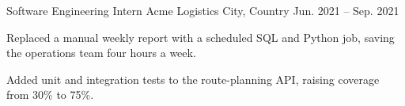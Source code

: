 \cventry
  {Software Engineering Intern}               %
  {Acme Logistics}                            %
  {City, Country}                             %
  {Jun. 2021 -- Sep. 2021}                    %
  {
    \begin{cvitems}
      \item {Replaced a manual weekly report with a scheduled SQL and Python
      job, saving the operations team four hours a week.}
      \item {Added unit and integration tests to the route-planning API,
      raising coverage from 30\% to 75\%.}
    \end{cvitems}
  }
